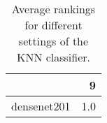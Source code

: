 \begin{table}[H]
\centering
\caption{Average rankings for different settings of the KNN classifier.}
\begin{tabular}{lr}
\toprule
{} &    9 \\
\midrule
densenet201 &  1.0 \\
\bottomrule
\end{tabular}
\label{tab:KNN}
\end{table}
